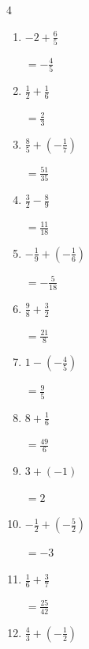 \begin{multicols}{4}
\begin{enumerate}
        $\displaystyle =-\frac{3}{2}$

  \item $\displaystyle -2 + \frac{6}{5}$

        $\displaystyle =-\frac{4}{5}$

  \item $\displaystyle \frac{1}{2} + \frac{1}{6}$

        $\displaystyle =\frac{2}{3}$

  \item $\displaystyle \frac{8}{5} + \left(-\frac{1}{7}\right)$

        $\displaystyle =\frac{51}{35}$

  \item $\displaystyle \frac{3}{2} - \frac{8}{9}$

        $\displaystyle =\frac{11}{18}$

  \item $\displaystyle -\frac{1}{9} + \left(-\frac{1}{6}\right)$

        $\displaystyle =-\frac{5}{18}$

  \item $\displaystyle \frac{9}{8} + \frac{3}{2}$

        $\displaystyle =\frac{21}{8}$

\columnbreak %

\resetques

  \item $\displaystyle 1 - \left(-\frac{4}{5}\right)$

        $\displaystyle =\frac{9}{5}$

  \item $\displaystyle 8 + \frac{1}{6}$

        $\displaystyle =\frac{49}{6}$

  \item $\displaystyle 3 + \left(-1\right)$

        $\displaystyle =2$

  \item $\displaystyle -\frac{1}{2} + \left(-\frac{5}{2}\right)$

        $\displaystyle =-3$

  \item $\displaystyle \frac{1}{6} + \frac{3}{7}$

        $\displaystyle =\frac{25}{42}$

  \item $\displaystyle \frac{4}{3} + \left(-\frac{1}{2}\right)$


\end{enumerate}
\end{multicols}
